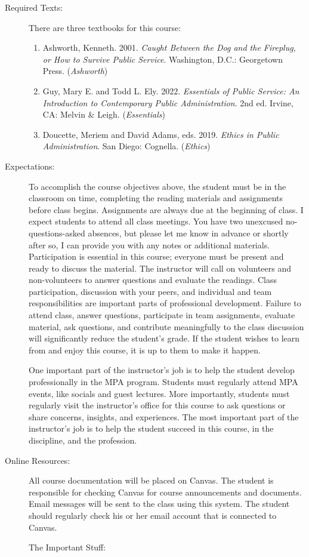 \documentclass[11pt]{article}
\begin{document}
\begin{description}
	\item[Required Texts:] There are three textbooks for this course: 
	\begin{enumerate}
		\item Ashworth, Kenneth. 2001. \emph{Caught Between the Dog and the Fireplug, or How to Survive Public Service}. Washington, D.C.: Georgetown Press. (\textit{Ashworth})
		\item Guy, Mary E. and Todd L. Ely. 2022. \emph{Essentials of Public Service: An Introduction to Contemporary Public Administration}. 2nd ed. Irvine, CA: Melvin \& Leigh. (\textit{Essentials})
		\item Doucette, Meriem and David Adams, eds. 2019. \emph{Ethics in Public Administration}. San Diego: Cognella. (\textit{Ethics})
	\end{enumerate}
	
	\item[Expectations:] To accomplish the course objectives above, the student must be in the classroom on time, completing the reading materials and assignments before class begins. Assignments are always due at the beginning of class. I expect students to attend all class meetings. You have two unexcused no-questions-asked absences, but please let me know in advance or shortly after so, I can provide you with any notes or additional materials. Participation is essential in this course; everyone must be present and ready to discuss the material. The instructor will call on volunteers and non-volunteers to answer questions and evaluate the readings. Class participation, discussion with your peers, and individual and team responsibilities are important parts of professional development. Failure to attend class, answer questions, participate in team assignments, evaluate material, ask questions, and contribute meaningfully to the class discussion will significantly reduce the student's grade. If the student wishes to learn from and enjoy this course, it is up to them to make it happen.
	
	One important part of the instructor's job is to help the student develop professionally in the MPA program. Students must regularly attend MPA events, like socials and guest lectures. More importantly, students must regularly visit the instructor's office for this course to ask questions or share concerns, insights, and experiences. The most important part of the instructor's job is to help the student succeed in this course, in the discipline, and the profession. 
	
	\item[Online Resources:] All course documentation will be placed on Canvas. The student is responsible for checking Canvas for course announcements and documents. Email messages will be sent to the class using this system. The student should regularly check his or her email account that is connected to Canvas. 
	\vspace{3ex}
	\begin{center}
		\begin{Large}
			The Important Stuff: 
		\end{Large}
	\end{center}
	\vspace{3ex}
	 

\end{description}
\end{document}
